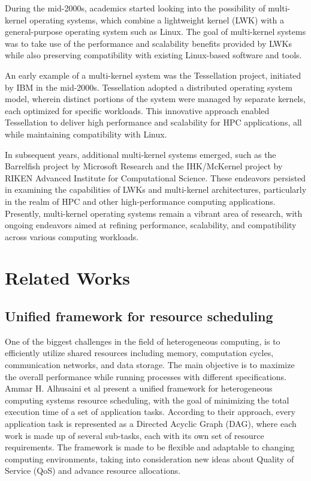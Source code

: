 \documentclass[16pt,a4paper]{article}
\begin{document}
During the mid-2000s, academics started looking into the possibility of multi-kernel operating systems, which combine a lightweight kernel (LWK) with a general-purpose operating system such as Linux. The goal of multi-kernel systems was to take use of the performance and scalability benefits provided by LWKs while also preserving compatibility with existing Linux-based software and tools.

An early example of a multi-kernel system was the Tessellation project, initiated by IBM in the mid-2000s. Tessellation adopted a distributed operating system model, wherein distinct portions of the system were managed by separate kernels, each optimized for specific workloads. This innovative approach enabled Tessellation to deliver high performance and scalability for HPC applications, all while maintaining compatibility with Linux. 

In subsequent years, additional multi-kernel systems emerged, such as the Barrelfish project by Microsoft Research and the IHK/McKernel project by RIKEN Advanced Institute for Computational Science. These endeavors persisted in examining the capabilities of LWKs and multi-kernel architectures, particularly in the realm of HPC and other high-performance computing applications. Presently, multi-kernel operating systems remain a vibrant area of research, with ongoing endeavors aimed at refining performance, scalability, and compatibility across various computing workloads.
\clearpage

\section{Related Works}
\subsection{Unified framework for resource scheduling}
One of the biggest challenges in the field of heterogeneous computing, is to efficiently utilize shared resources including memory, computation cycles, communication networks, and data storage. The main objective is to maximize the overall performance while running processes with different specifications. Ammar H. Alhusaini et al present a unified framework for heterogeneous computing systems resource scheduling, with the goal of minimizing the total execution time of a set of application tasks. According to their approach, every application task is represented as a Directed Acyclic Graph (DAG), where each work is made up of several sub-tasks, each with its own set of resource requirements. The framework is made to be flexible and adaptable to changing computing environments, taking into consideration new ideas about Quality of Service (QoS) and advance resource allocations. 
\end{document}
